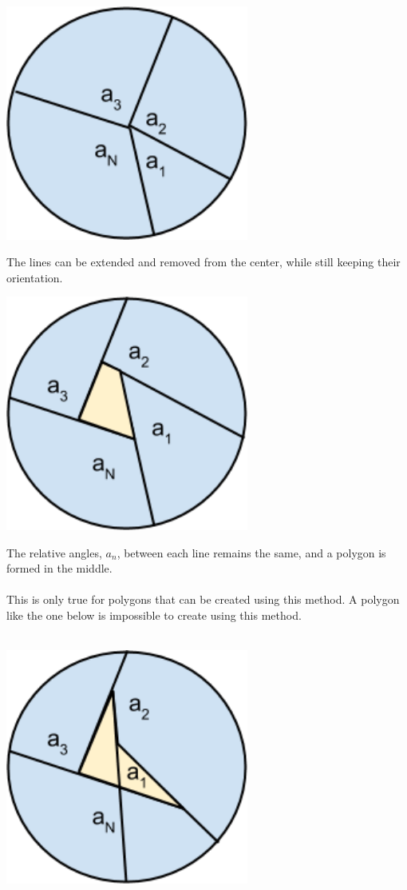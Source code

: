 \begin{center}
\includegraphics[width=8cm]{Geometry/polygon_ext_angles_diag1}
\end{center}
The lines can be extended and removed from the center, while still keeping their orientation. \\
\begin{center}
\includegraphics[width=8cm]{Geometry/polygon_ext_angles_diag2}
\end{center}
The relative angles, \(a_n\), between each line remains the same, and a polygon is formed in the middle.\\
\\
This is only true for polygons that can be created using this method.  A polygon like the one below is impossible to create using this method. \\
\\
\begin{center}
\includegraphics[width=8cm]{Geometry/polygon_ext_angles_diag3}
\end{center}
